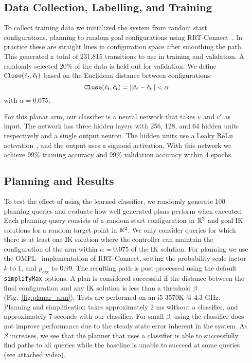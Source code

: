 \subsection{Data Collection, Labelling, and Training}

To collect training data we initialized the system from random start configurations, planning to random goal configurations using RRT-Connect~\cite{kuffner2000rrt}. In practice these are straight lines in configuration space after smoothing the path. This generated a total of 231,815 transitions to use in training and validation. A randomly selected 20\% of the data is held out for validation. We define $\texttt{Close}(\hat{c}_t, \tilde{c}_t)$ based on the Euclidean distance between configurations:
\begin{equation}
    \texttt{Close}(\hat{c}_t, \tilde{c}_t) = \| \hat{c}_t - \tilde{c}_t \| < \alpha
\end{equation}
with $\alpha = 0.075$.

For this planar arm, our classifier is a neural network that takes $c$ and $c'$ as input. The network has three hidden layers with 256, 128, and 64 hidden units respectively and a single output neuron. The hidden units use a Leaky ReLu activation~\cite{maas2013rectifier}, and the output uses a sigmoid activation. With this network we achieve 99\% training accuracy and 99\% validation accuracy within 4 epochs.


\subsection{Planning and Results} 



To test the effect of using the learned classifier, we randomly generate 100 planning queries and evaluate how well generated plans perform when executed. Each planning query consists of a random start configuration in $\mathbb{R}^3$ and goal IK solutions for a random target point in $\mathbb{R}^2$. We only consider queries for which there is at least one IK solution where the controller can maintain the configuration of the arm within $\alpha = 0.075$ of the IK solution. For planning we use the OMPL~\cite{ompl} implementation of RRT-Connect, setting the probability scale factor $k$ to 1, and $p_{acc}$ to 0.99. The resulting path is post-processed using the default \texttt{simplifyMax} options. A plan is considered successful if the distance between the final configuration and any IK solution is less than a threshold $\beta$ (Fig.~\ref{fig:planar_arm}). Tests are performed on an i5-3570K @ 4.3 GHz. Planning and simplification takes approximately 2 ms without a classifier, and approximately 7 seconds with our classifier. For small $\beta$, using the classifier does not improve performance due to the steady state error inherent in the system. As $\beta$ increases, we see that the planner that uses a classifier is able to successfully find paths to all queries while the baseline is unable to succeed at some queries (see attached video).

